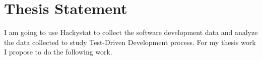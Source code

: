 
\chapter{Thesis Statement}

I am going to use Hackystat to collect the software development data and
analyze the data collected to study Test-Driven Development process. For my
thesis work I propose to do the following work.

